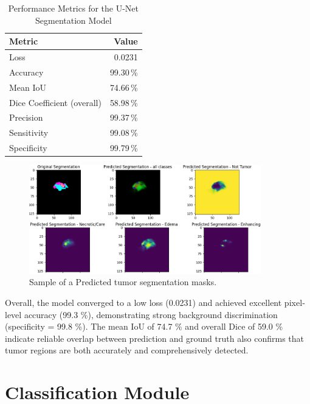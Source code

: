 \begin{table}[ht]
  \centering
  \caption{Performance Metrics for the U-Net Segmentation Model}
  \label{tab:segmentation-results}
  \begin{tabular}{l r}
    \hline
    \textbf{Metric}            & \textbf{Value} \\
    \hline
    Loss                       & 0.0231         \\
    Accuracy                   & 99.30\,\%      \\
    Mean IoU                   & 74.66\,\%      \\
    Dice Coefficient (overall) & 58.98\,\%      \\
    Precision                  & 99.37\,\%      \\
    Sensitivity                & 99.08\,\%      \\
    Specificity                & 99.79\,\%      \\
    \hline
  \end{tabular}
\end{table}

\begin{figure}[h]
  \centering
  \includegraphics[width=0.9\textwidth]{Images/Chapter3/seg.png}
  \caption{Sample of a Predicted tumor segmentation masks.}
  \label{fig:segmentation-example}
\end{figure}




Overall, the model converged to a low loss (0.0231) and achieved excellent pixel‐level accuracy (99.3 \%), demonstrating strong background discrimination (specificity = 99.8 \%). The mean IoU of 74.7 \% and overall Dice of 59.0 \% indicate reliable overlap between prediction and ground truth also confirms that tumor regions are both accurately and comprehensively detected.


\section{Classification Module}
\label{sec:contribution-classification}

